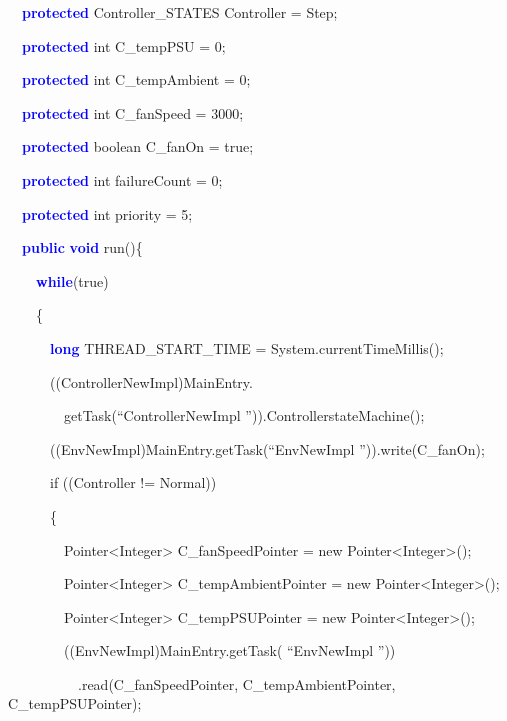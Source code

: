 \documentclass{llncs}%
\begin{document}
{\ttfamily
\ \ \textbf{\textcolor{blue}{protected}} Controller\_STATES Controller =
Step;}

{\ttfamily
\ \ \textbf{\textcolor{blue}{protected}} int C\_tempPSU = 0;}

{\ttfamily
\ \ \textbf{\textcolor{blue}{protected}} int C\_tempAmbient = 0;}

{\ttfamily
\ \ \textbf{\textcolor{blue}{protected}} int C\_fanSpeed = 3000;}

{\ttfamily
\ \ \textbf{\textcolor{blue}{protected}} boolean C\_fanOn = true;}

{\ttfamily
\ \ \textbf{\textcolor{blue}{protected}} int failureCount = 0;}

{\ttfamily
\ \ \textbf{\textcolor{blue}{protected}} int priority = 5;}


\bigskip

{\ttfamily
\ \ \textbf{\textcolor{blue}{public}} \textbf{\textcolor{blue}{void}}
run()\{}

{\ttfamily
\ \ \ \ \textbf{\textcolor{blue}{while}}(true)}

{\ttfamily
\ \ \ \ \{}

{\ttfamily
\ \ \ \ \ \ \textbf{\textcolor{blue}{long}} THREAD\_START\_TIME =
System.currentTimeMillis();}

{\ttfamily
\ \ \ \ \ \ ((ControllerNewImpl)MainEntry.}

{\ttfamily
\ \ \ \ \ \ \ \ getTask(``ControllerNewImpl '')).ControllerstateMachine();}

{\ttfamily
\ \ \ \ \ \ ((EnvNewImpl)MainEntry.getTask(``EnvNewImpl '')).write(C\_fanOn);}

{\ttfamily
\ \ \ \ \ \ if ((Controller != Normal))}

{\ttfamily
\ \ \ \ \ \ \{}

{\ttfamily
\ \ \ \ \ \ \ \ Pointer{\textless}Integer{\textgreater}
C\_fanSpeedPointer = new Pointer{\textless}Integer{\textgreater}();}

{\ttfamily
\ \ \ \ \ \ \ \ Pointer{\textless}Integer{\textgreater}
C\_tempAmbientPointer = new Pointer{\textless}Integer{\textgreater}();}

{\ttfamily
\ \ \ \ \ \ \ \ Pointer{\textless}Integer{\textgreater}
C\_tempPSUPointer = new Pointer{\textless}Integer{\textgreater}();}

{\ttfamily
\ \ \ \ \ \ \ \ ((EnvNewImpl)MainEntry.getTask( ``EnvNewImpl ''))}

{\ttfamily
\ \ \ \ \ \ \ \ \ \ .read(C\_fanSpeedPointer, C\_tempAmbientPointer,
C\_tempPSUPointer);}
\end{document}
